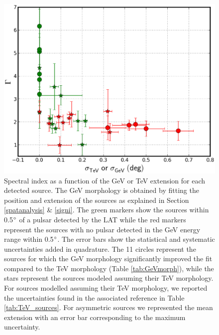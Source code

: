 \begin{figure}[h!]
\centering
\includegraphics[width=\textwidth]{figures/index_vs_size.eps}
\caption{Spectral index as a function of the GeV or TeV extension for each detected source. The GeV morphology is obtained by fitting the position and extension of the sources as explained in Section \ref{spatanalysis} \& \ref{signi}. The green markers show the sources within 0.5$\mbox{$^\circ$}$ of a pulsar detected by the LAT while the red markers represent the sources with no pulsar detected in the GeV energy range within 0.5$\mbox{$^\circ$}$. The error bars show the statistical and systematic uncertainties added in quadrature. The 11 circles represent the sources for which the GeV morphology significantly improved the fit compared to the TeV morphology (Table \ref{tab:GeVmorph}), while the stars represent the sources modeled assuming their TeV morphology. For sources modelled assuming their TeV morphology, we reported the uncertainties found in the associated reference in Table \ref{tab:TeV_sources}. For asymmetric sources we represented the mean extension with an error bar corresponding to the maximum uncertainty.
\label{fig:indexvssize}}
\end{figure}



